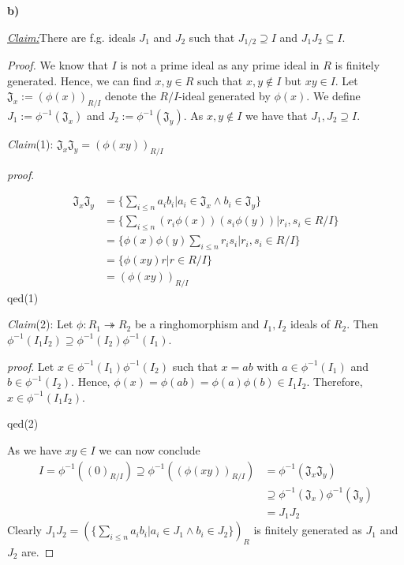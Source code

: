 \documentclass{article}
\newcommand{\inv}[1]{{#1}^{-1}}
\newcommand{\claim}
{\underline{\textit{Claim:}}\hspace{0,2cm}}
\newcommand{\subclaim}[1]
{

	\vspace*{0,2cm}
	\textit{Claim}({#1}):
}
\newcommand{\subqed}[1]{\hfill\textsf{qed}({#1})}
\newcommand{\subproof}{

\noindent\textit{proof}.\hspace{0,1cm}
}
\newcommand{\teilaufgabe}[1]{
{       

	\noindent\hspace*{0,1 cm}\textbf{#1)}
}
}
\theoremstyle{definition}
\theoremstyle{plain}
\theoremstyle{remark}
\begin{document}
	\teilaufgabe{b}\claim There are f.g. ideals $J_1$ and $J_2$ such that $J_{1/2}\supseteq I$ and $J_1J_2\subseteq I$.
\begin{proof}
	We know that $I$ is not a prime ideal as any prime ideal in $R$ is finitely generated. Hence, we can find $x,y\in R$ such that $x,y\notin I$ but $xy\in I$. Let $\mathfrak{J}_x:= (\phi(x))_{R/I}$ denote the $R/I$-ideal generated by $\phi(x)$.
	We define $J_1 := \inv{\phi}(\mathfrak{J}_x)$ and $J_2 := \inv{\phi}(\mathfrak{J}_{y})$. As $x,y\notin I$ we have that $J_1,J_2\supseteq I$. 
	\subclaim1 $\mathfrak{J}_x\mathfrak{J}_y = (\phi(xy))_{R/I}$
	\subproof 
	\begin{align}
		\mathfrak{J}_x\mathfrak{J}_y 	&= \{\sum_{i\leq n}a_ib_i|a_i\in \mathfrak{J}_x \wedge b_i\in \mathfrak{J}_y\} \\
						&= \{\sum_{i\leq n}(r_i\phi(x))(s_i\phi(y))|r_i,s_i\in R/I\} \\
						&= \{\phi(x)\phi(y)\sum_{i\leq n}r_is_i|r_i,s_i\in R/I\} \\
						&= \{\phi(xy) r|r\in R/I\}\\
						&= (\phi(xy))_{R/I}
	\end{align}
\subqed1 
\subclaim2 Let $\phi:R_1\twoheadrightarrow R_2$ be a ringhomorphism and $I_1, I_2$ ideals of $R_2$. Then $\inv{\phi}(I_1 I_2) \supseteq \inv{\phi}(I_2)\inv{\phi}(I_1)$.
\subproof Let $x\in \inv{\phi}(I_1)\inv{\phi}(I_2)$ such that $x = ab$ with $a\in \inv{\phi}(I_1)$ and $b\in\inv{\phi}(I_2)$. Hence, $\phi(x)=\phi(ab)=\phi(a)\phi(b)\in I_1I_2$. Therefore, $x\in \phi^{-1}(I_1I_2)$.

\subqed2

	As we have $xy\in I$ we can now conclude
	\begin{align}
		I=\inv{\phi}((0)_{R/I})\supseteq \inv{\phi}((\phi(xy))_{R/I}) &= \inv{\phi}(\mathfrak{J}_x\mathfrak{J}_y) \\
							&\supseteq \phi^{-1}(\mathfrak{J}_x)\inv{\phi}(\mathfrak{J}_y)\\
							&= J_1J_2
	\end{align}
	Clearly $J_1J_2=(\{\sum_{i\leq n }a_ib_i|a_i\in J_1\wedge b_i\in J_2\})_R$ is finitely generated as $J_1$ and $J_2$ are.
\end{proof}	
\end{document}
